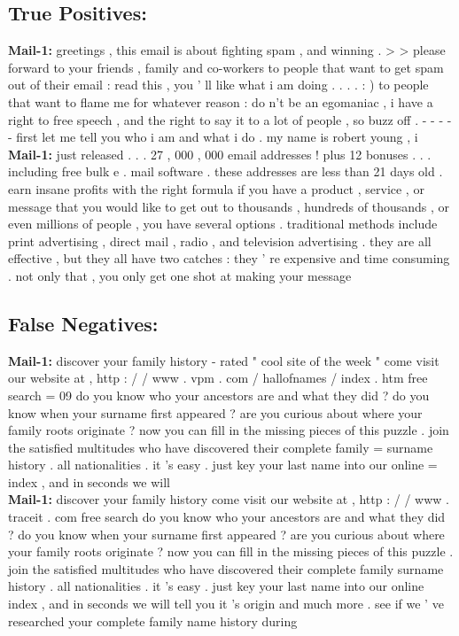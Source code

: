 \documentclass[
	letterpaper, %
	12pt, %
	unnumberedsections, %
	twoside, %
]{LTJournalArticle}
\begin{document}
\begin{appendices}
	\subsection{True Positives:}
	{\ttfamily \tiny
		\noindent\textbf{Mail-1:} greetings , this email is about fighting spam , and winning . > > please forward to your friends , family and co-workers to people that want to get spam out of their email : read this , you ' ll like what i am doing . . . . : ) to people that want to flame me for whatever reason : do n't be an egomaniac , i have a right to free speech , and the right to say it to a lot of people , so buzz off . - - - - - first let me tell you who i am and what i do . my name is robert young , i \\

		\noindent\textbf{Mail-1:} just released . . . 27 , 000 , 000 email addresses ! plus 12 bonuses . . . including free bulk e . mail software . these addresses are less than 21 days old . earn insane profits with the right formula if you have a product , service , or message that you would like to get out to thousands , hundreds of thousands , or even millions of people , you have several options . traditional methods include print advertising , direct mail , radio , and television advertising . they are all effective , but they all have two catches : they ' re expensive and time consuming . not only that , you only get one shot at making your message \\


	}

	\subsection{False Negatives:}
	{\ttfamily \tiny
		\noindent\textbf{Mail-1:} discover your family history - rated " cool site of the week " come visit our website at , http : / / www . vpm . com / hallofnames / index . htm free search = 09 do you know who your ancestors are and what they did ? do you know when your surname first appeared ? are you curious about where your family roots originate ? now you can fill in the missing pieces of this puzzle . join the satisfied multitudes who have discovered their complete family = surname history . all nationalities . it 's easy . just key your last name into our online = index , and in seconds we will \\

		\noindent\textbf{Mail-1:} discover your family history come visit our website at , http : / / www . traceit . com free search do you know who your ancestors are and what they did ? do you know when your surname first appeared ? are you curious about where your family roots originate ? now you can fill in the missing pieces of this puzzle . join the satisfied multitudes who have discovered their complete family surname history . all nationalities . it 's easy . just key your last name into our online index , and in seconds we will tell you it 's origin and much more . see if we ' ve researched your complete family name history during \\


}
\end{appendices}
\end{document}
